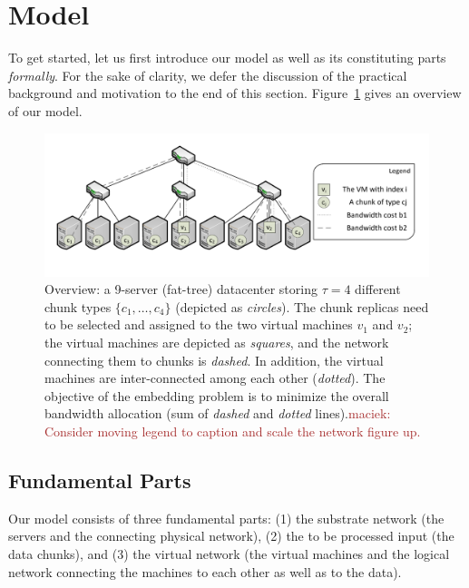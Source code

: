 \documentclass[9pt]{sigcomm-alternate}
\newcommand{\maciek}[1]{\textcolor{brown}{maciek: #1}}
\begin{document}
\section{Model}\label{sec:model}

To get started, let us first introduce our model as well as its constituting parts \emph{formally}.
For the sake of clarity, we defer the discussion of the practical background and motivation
to the end of this section. Figure~\ref{fig:overview} gives an overview of our model.

\begin{figure}[t]
\centering
\includegraphics[width=0.99\columnwidth]{figs/overview-fig.pdf}
\caption{Overview: a 9-server (fat-tree) datacenter storing $\tau=4$ different chunk
types $\{c_1,\ldots,c_4\}$ (depicted as \emph{circles}). The chunk replicas need to be selected and assigned to the two
 virtual machines $v_1$ and $v_2$; the virtual machines are depicted as \emph{squares}, and
 the network connecting them to chunks is \emph{dashed}. In addition, the virtual machines are inter-connected among
 each other (\emph{dotted}). The objective of the embedding problem is to minimize the overall bandwidth allocation
 (sum of \emph{dashed} and \emph{dotted} lines).\maciek{Consider moving legend to caption and scale the network figure up.}}
\label{fig:overview}
\end{figure}



\subsection{Fundamental Parts}

Our model consists of three fundamental parts: (1) the substrate network (the servers
and the connecting physical network),
(2) the to be processed input (the data chunks), and
(3) the virtual network (the virtual machines and the logical network connecting the machines to each other
as well as to the data).
\end{document}
